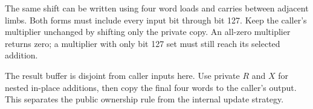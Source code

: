 The same shift can be written using four word loads and carries between adjacent
limbs. Both forms must include every input bit through bit 127. Keep the caller's
multiplier unchanged by shifting only the private copy. An all-zero multiplier returns
zero; a multiplier with only bit 127 set must still reach its selected addition.

The result buffer is disjoint from caller inputs here. Use private \(R\) and \(X\)
for nested in-place additions, then copy the final four words to the caller's output.
This separates the public ownership rule from the internal update strategy.
